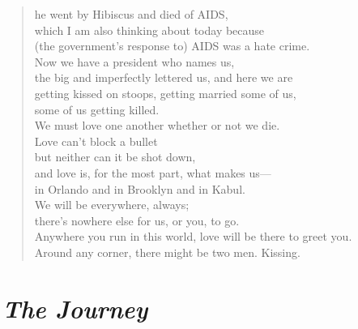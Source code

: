 \documentclass[12pt, openany, letterpaper]{memoir}
\begin{document}
\begin{verse}
	he went by Hibiscus and died of AIDS,\\
	which I am also thinking about today because\\
	(the government's response to) AIDS was a hate crime.\\
	Now we have a president who names us,\\
	the big and imperfectly lettered us, and here we are\\
	getting kissed on stoops, getting married some of us,\\
	some of us getting killed.\\
	We must love one another whether or not we die.\\
	Love can't block a bullet\\
	but neither can it be shot down,\\
	and love is, for the most part, what makes us—\\
	in Orlando and in Brooklyn and in Kabul.\\
	We will be everywhere, always;\\
	there's nowhere else for us, or you, to go.\\
	Anywhere you run in this world, love will be there to greet you.\\
	Around any corner, there might be two men. Kissing.
\end{verse}

\newpage
\section*{\emph{The Journey}}
\end{document}
